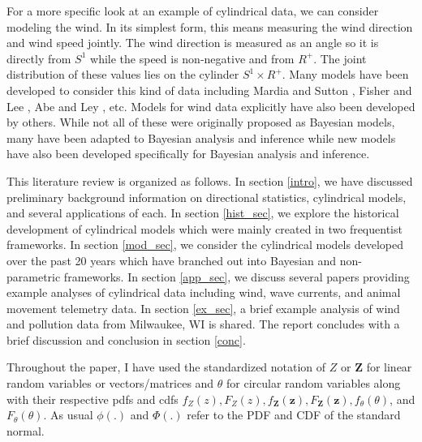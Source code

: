 For a more specific look at an example of cylindrical data, we can consider modeling the wind. In its simplest form, this means measuring the wind direction and wind speed jointly. The wind direction is measured as an angle so it is directly from $S^1$ while the speed is non-negative and from $R^+$. The joint distribution of these values lies on the cylinder $S^1 \times R^+$. Many models have been developed to consider this kind of data including Mardia and Sutton \cite{mardia_model_1978}, Fisher and Lee \cite{fisher_regression_1992}, Abe and Ley \cite{abe_tractable_2017}, etc. Models for wind data explicitly have also been developed by others. While not all of these were originally proposed as Bayesian models, many have been adapted to Bayesian analysis and inference while new models have also been developed specifically for Bayesian analysis and inference.

This literature review is organized as follows. In section \ref{intro}, we have discussed preliminary background information on directional statistics, cylindrical models, and several applications of each. In section \ref{hist_sec}, we explore the historical development of cylindrical models which were mainly created in two frequentist frameworks. In section \ref{mod_sec}, we consider the cylindrical models developed over the past 20 years which have branched out into Bayesian and non-parametric frameworks. In section \ref{app_sec}, we discuss several papers providing example analyses of cylindrical data including wind, wave currents, and animal movement telemetry data. In section \ref{ex_sec}, a brief example analysis of wind and pollution data from Milwaukee, WI is shared. The report concludes with a brief discussion and conclusion in section \ref{conc}. 

Throughout the paper, I have used the standardized notation of $Z$ or $\mathbf{Z}$ for linear random variables or vectors/matrices and $\theta$ for circular random variables along with their respective pdfs and cdfs $f_Z(z), F_Z(z), f_\mathbf{Z}(\mathbf{z}), F_\mathbf{Z}(\mathbf{z}), f_\theta(\theta)$, and $F_\theta(\theta)$. As usual $\phi(.)$ and $\Phi(.)$ refer to the PDF and CDF of the standard normal. 